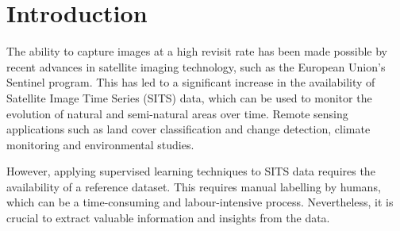\chapter{Introduction}




The ability to capture images at a high revisit rate has been made possible by recent advances in satellite imaging technology, such as the European Union's Sentinel program.
This has led to a significant increase in the availability of Satellite Image Time Series (SITS) data, which can be used to monitor the evolution of natural and semi-natural areas over time.
Remote sensing applications such as land cover classification and change detection, climate monitoring and environmental studies.

However, applying supervised learning techniques to SITS data requires the availability of a reference dataset.
This requires manual labelling by humans, which can be a time-consuming and labour-intensive process.
Nevertheless, it is crucial to extract valuable information and insights from the data.


